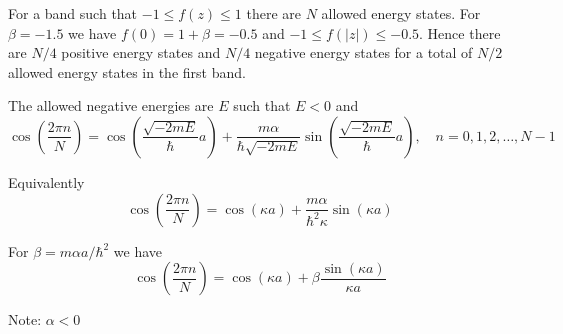 


\bigskip
For a band such that $-1\le f(z)\le1$ there are $N$ allowed energy states.
For $\beta=-1.5$ we have $f(0)=1+\beta=-0.5$ and $-1\le f(|z|)\le-0.5$.
Hence there are $N/4$ positive energy states and $N/4$ negative energy states
for a total of $N/2$ allowed energy states in the first band.

\bigskip
The allowed negative energies are $E$ such that $E<0$ and
\begin{equation*}
\cos\left(\frac{2\pi n}{N}\right)
=\cos\left(\frac{\sqrt{-2mE}}{\hbar}a\right)
+\frac{m\alpha}{\hbar\sqrt{-2mE}}\sin\left(\frac{\sqrt{-2mE}}{\hbar}a\right),\quad
n=0,1,2,\ldots,N-1
\end{equation*}

Equivalently
\begin{equation*}
\cos\left(\frac{2\pi n}{N}\right)
=\cos\left(\kappa a\right)
+\frac{m\alpha}{\hbar^2\kappa}\sin\left(\kappa a\right)
\end{equation*}

For $\beta=m\alpha a/\hbar^2$ we have
\begin{equation*}
\cos\left(\frac{2\pi n}{N}\right)
=\cos\left(\kappa a\right)
+\beta\frac{\sin\left(\kappa a\right)}{\kappa a}
\end{equation*}

Note: $\alpha<0$


